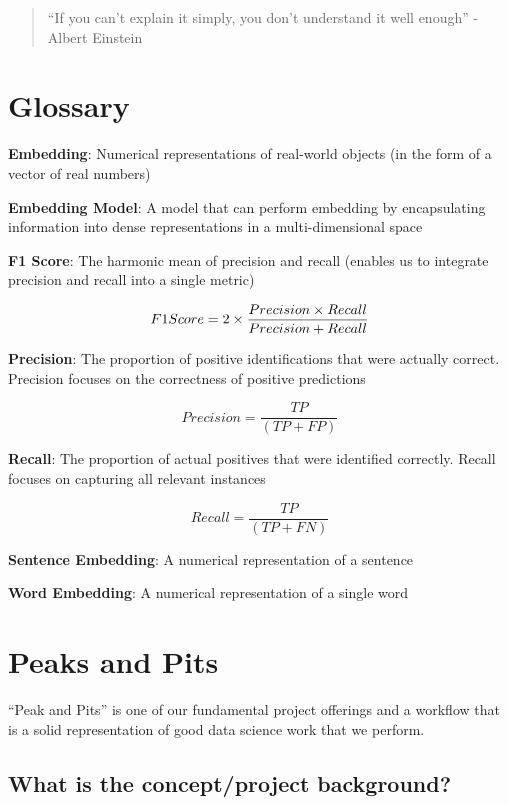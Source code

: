\documentclass[
  letterpaper,
  DIV=11,
  numbers=noendperiod]{scrreprt}
\begin{document}
\begin{quote}
``If you can't explain it simply, you don't understand it well enough''
- Albert Einstein
\end{quote}


\chapter{Glossary}\label{glossary}

\textbf{Embedding}: Numerical representations of real-world objects (in
the form of a vector of real numbers)

\textbf{Embedding Model}: A model that can perform embedding by
encapsulating information into dense representations in a
multi-dimensional space

\textbf{F1 Score}: The harmonic mean of precision and recall (enables us
to integrate precision and recall into a single metric)

\[
F1 \space Score = 2 \times \dfrac{Precision \times Recall}{Precision + Recall}
\]

\textbf{Precision}: The proportion of positive identifications that were
actually correct. Precision focuses on the correctness of positive
predictions

\[
Precision = \dfrac{TP}{(TP + FP) }
\]

\textbf{Recall}: The proportion of actual positives that were identified
correctly. Recall focuses on capturing all relevant instances

\[
Recall = \dfrac{TP}{(TP + FN) }
\]

\textbf{Sentence Embedding}: A numerical representation of a sentence

\textbf{Word Embedding}: A numerical representation of a single word


\chapter{Peaks and Pits}\label{peaks-and-pits}

``Peak and Pits'' is one of our fundamental project offerings and a
workflow that is a solid representation of good data science work that
we perform.

\section{What is the concept/project
background?}\label{what-is-the-conceptproject-background}
\end{document}
